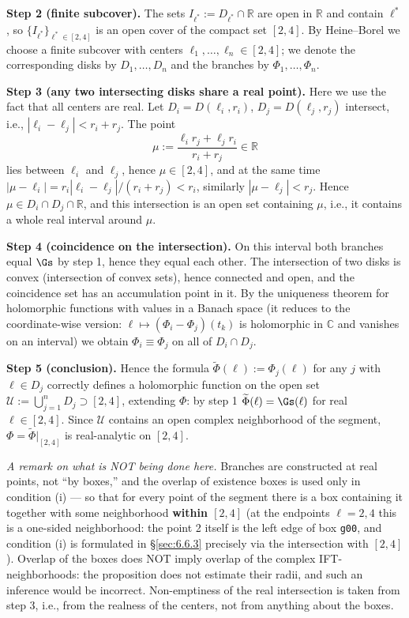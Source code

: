 \textbf{Step 2 (finite subcover).} The sets $I_{\ell^{\ast}}:=D_{\ell^{\ast}}\cap\mathbb R$ are open in $\mathbb R$ and contain $\ell^{\ast}$, so $\{I_{\ell^{\ast}}\}_{\ell^{\ast}\in[2,4]}$ is an open cover of the compact set $[2,4]$. By Heine--Borel we choose a finite subcover with centers $\ell_1,\dots,\ell_n\in[2,4]$; we denote the corresponding disks by $D_1,\dots,D_n$ and the branches by $\Phi_1,\dots,\Phi_n$.

\textbf{Step 3 (any two intersecting disks share a real point).} Here we use the fact that all centers are real. Let $D_i=D(\ell_i,r_i)$, $D_j=D(\ell_j,r_j)$ intersect, i.e., $|\ell_i-\ell_j|<r_i+r_j$. The point
\[
\mu:=\frac{\ell_i r_j+\ell_j r_i}{r_i+r_j}\in\mathbb R
\]
lies between $\ell_i$ and $\ell_j$, hence $\mu\in[2,4]$, and at the same time $|\mu-\ell_i|=r_i|\ell_i-\ell_j|/(r_i+r_j)<r_i$, similarly $|\mu-\ell_j|<r_j$. Hence $\mu\in D_i\cap D_j\cap\mathbb R$, and this intersection is an open set containing $\mu$, i.e., it contains a whole real interval around $\mu$.

\textbf{Step 4 (coincidence on the intersection).} On this interval both branches equal $\Gs$ by step 1, hence they equal each other. The intersection of two disks is convex (intersection of convex sets), hence connected and open, and the coincidence set has an accumulation point in it. By the uniqueness theorem for holomorphic functions with values in a Banach space (it reduces to the coordinate-wise version: $\ell\mapsto(\Phi_i-\Phi_j)(t_k)$ is holomorphic in $\mathbb C$ and vanishes on an interval) we obtain $\Phi_i\equiv\Phi_j$ on all of $D_i\cap D_j$.

\textbf{Step 5 (conclusion).} Hence the formula $\widetilde\Phi(\ell):=\Phi_j(\ell)$ for any $j$ with $\ell\in D_j$ correctly defines a holomorphic function on the open set $\mathcal U:=\bigcup_{j=1}^{n}D_j\supset[2,4]$, extending $\Phi$: by step 1 $\widetilde\Phi(\ell)=\Gs(\ell)$ for real $\ell\in[2,4]$. Since $\mathcal U$ contains an open complex neighborhood of the segment, $\Phi=\widetilde\Phi|_{[2,4]}$ is real-analytic on $[2,4]$.

\emph{A remark on what is NOT being done here.} Branches are constructed at real
points, not ``by boxes,'' and the overlap of existence boxes is used only in
condition (i) --- so that for every point of the segment there is a box
containing it together with some neighborhood \textbf{within \boldmath$[2,4]$} (at the
endpoints $\ell = 2, 4$ this is a one-sided neighborhood: the point 2 itself is
the left edge of box \texttt{g00}, and condition (i) is formulated in \S\ref{sec:6.6.3}
precisely via the intersection with $[2,4]$). Overlap of the boxes does NOT
imply overlap of the complex IFT-neighborhoods: the proposition does not
estimate their radii, and such an inference would be incorrect. Non-emptiness
of the real intersection is taken from step 3, i.e., from the realness of the
centers, not from anything about the boxes.


